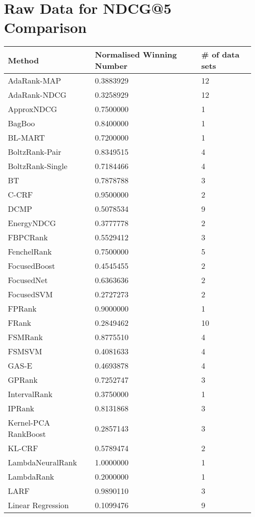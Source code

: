\chapter{Raw Data for NDCG@5 Comparison}
\label{app:norm_winnum_ndcg5}

\begin{longtable}{l|l|l}
Method & Normalised Winning Number & \# of data sets \\
\hline
AdaRank-\acs{MAP} & 0.3883929 & 12 \\ 
AdaRank-\acs{NDCG} & 0.3258929 & 12 \\ 
Approx\acs{NDCG} & 0.7500000 & 1 \\ 
BagBoo & 0.8400000 & 1 \\ 
BL-MART & 0.7200000 & 1 \\ 
BoltzRank-Pair & 0.8349515 & 4 \\ 
BoltzRank-Single & 0.7184466 & 4 \\ 
BT & 0.7878788 & 3 \\ 
C-\acs{CRF} & 0.9500000 & 2 \\ 
DCMP & 0.5078534 & 9 \\ 
Energy\ac{NDCG} & 0.3777778 & 2 \\ 
FBPCRank & 0.5529412 & 3 \\ 
FenchelRank & 0.7500000 & 5 \\ 
FocusedBoost & 0.4545455 & 2 \\ 
FocusedNet & 0.6363636 & 2 \\ 
Focused\acs{SVM} & 0.2727273 & 2 \\ 
FPRank & 0.9000000 & 1 \\ 
FRank & 0.2849462 & 10 \\ 
FSMRank & 0.8775510 & 4 \\ 
FSM\acs{SVM} & 0.4081633 & 4 \\ 
GAS-E & 0.4693878 & 4 \\ 
\acs{GPRank} & 0.7252747 & 3 \\ 
IntervalRank & 0.3750000 & 1 \\ 
\acs{IP}Rank & 0.8131868 & 3 \\ 
Kernel-\acs{PCA} RankBoost & 0.2857143 & 3 \\ 
KL-\acs{CRF} & 0.5789474 & 2 \\ 
LambdaNeuralRank & 1.0000000 & 1 \\ 
LambdaRank & 0.2000000 & 1 \\ 
LARF & 0.9890110 & 3 \\ 
Linear Regression & 0.1099476 & 9 \\ 

\end{longtable}
